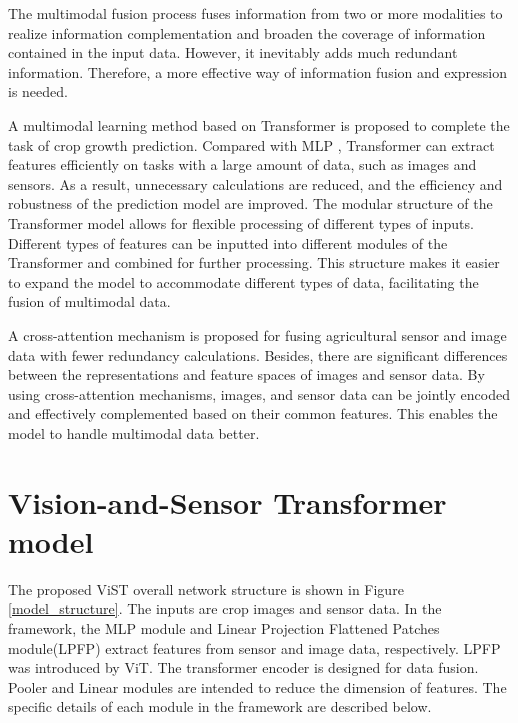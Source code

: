 \documentclass[acmsmall, screen]{acmart}
\begin{document}
The multimodal fusion process fuses information from two or more modalities to realize information complementation and broaden the coverage of information contained in the input data. \cite{ 8269806} However, it inevitably adds much redundant information. Therefore, a more effective way of information fusion and expression is needed.

 




A multimodal learning method based on Transformer\cite{vaswani_attention_2017} is proposed to complete the task of crop growth prediction. Compared with MLP \cite{ maimaitijiang_soybean_2020}, Transformer can extract features efficiently on tasks with a large amount of data, such as images and sensors. As a result, unnecessary calculations are reduced, and the efficiency and robustness of the prediction model are improved. The modular structure of the Transformer model allows for flexible processing of different types of inputs. Different types of features can be inputted into different modules of the Transformer and combined for further processing. This structure makes it easier to expand the model to accommodate different types of data, facilitating the fusion of multimodal data.

A cross-attention mechanism is proposed for fusing agricultural sensor and image data with fewer redundancy calculations. Besides, there are significant differences between the representations and feature spaces of images and sensor data. By using cross-attention mechanisms, images, and sensor data can be jointly encoded and effectively complemented based on their common features. This enables the model to handle multimodal data better.


\section{Vision-and-Sensor Transformer model}

The proposed ViST overall network structure is shown in Figure \ref{model_structure}. The inputs are crop images and sensor data. In the framework, the MLP module and Linear Projection Flattened Patches module(LPFP) extract features from sensor and image data, respectively. LPFP was introduced by ViT\cite{dosovitskiy_image_2021}. The transformer encoder is designed for data fusion. Pooler and Linear modules are intended to reduce the dimension of features. The specific details of each module in the framework are described below.
\end{document}
